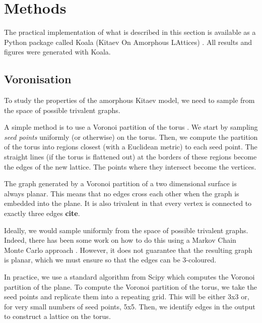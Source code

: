 \hypertarget{methods}{%
\section{Methods}\label{methods}}

The practical implementation of what is described in this section is available as a Python package called Koala (Kitaev On Amorphous LAttices) \autocite{tomImperialCMTHKoalaFirst2022}. All results and figures were generated with Koala.

\hypertarget{voronisation}{%
\subsection{Voronisation}\label{voronisation}}

To study the properties of the amorphous Kitaev model, we need to sample from the space of possible trivalent graphs.

A simple method is to use a Voronoi partition of the torus \autocite{mitchellAmorphousTopologicalInsulators2018,marsalTopologicalWeaireThorpeModels2020,florescu_designer_2009}. We start by sampling \emph{seed points} uniformly (or otherwise) on the torus. Then, we compute the partition of the torus into regions closest (with a Euclidean metric) to each seed point. The straight lines (if the torus is flattened out) at the borders of these regions become the edges of the new lattice. The points where they intersect become the vertices.

The graph generated by a Voronoi partition of a two dimensional surface is always planar. This means that no edges cross each other when the graph is embedded into the plane. It is also trivalent in that every vertex is connected to exactly three edges \textbf{cite}.

Ideally, we would sample uniformly from the space of possible trivalent graphs. Indeed, there has been some work on how to do this using a Markov Chain Monte Carlo approach \autocite{alyamiUniformSamplingDirected2016}. However, it does not guarantee that the resulting graph is planar, which we must ensure so that the edges can be 3-coloured.

In practice, we use a standard algorithm \autocite{barberQuickhullAlgorithmConvex1996} from Scipy \autocite{virtanenSciPyFundamentalAlgorithms2020a} which computes the Voronoi partition of the plane. To compute the Voronoi partition of the torus, we take the seed points and replicate them into a repeating grid. This will be either 3x3 or, for very small numbers of seed points, 5x5. Then, we identify edges in the output to construct a lattice on the torus.

